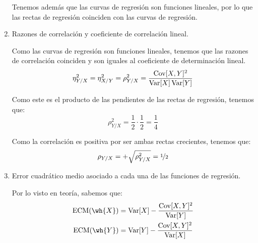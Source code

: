 \begin{ejercicio}
\begin{enumerate}
        Tenemos además que las curvas de regresión son funciones lineales, por lo que las rectas de regresión coinciden con las curvas de regresión.
        \item Razones de correlación y coeficiente de correlación lineal.
        
        Como las curvas de regresión son funciones lineales, tenemos que las razones de correlación coinciden y son iguales al coeficiente de determinación lineal.
        \begin{equation*}
            \eta_{Y/X}^2 = \eta_{X/Y}^2 = \rho_{Y/X}^2 = \dfrac{\operatorname{Cov}[X,Y]^2}{\operatorname{Var}[X]\operatorname{Var}[Y]}
        \end{equation*}
        
        Como este es el producto de las pendientes de las rectas de regresión, tenemos que:
        \begin{equation*}
            \rho_{Y/X}^2 = \dfrac{1}{2}\cdot \dfrac{1}{2} = \dfrac{1}{4}
        \end{equation*}

        Como la correlación es positiva por ser ambas rectas crecientes, tenemos que:
        \begin{equation*}
            \rho_{Y/X} =  + \sqrt{\rho_{Y/X}^2} = \nicefrac{1}{2}
        \end{equation*}

        \item Error cuadrático medio asociado a cada una de las funciones de regresión.
        
        Por lo visto en teoría, sabemos que:
        \begin{align*}
            \text{ECM}(\wh{X}) &= \Var[X] - \dfrac{\Cov[X,Y]^2}{\Var[Y]}\\
            \text{ECM}(\wh{Y}) &= \Var[Y] - \dfrac{\Cov[X,Y]^2}{\Var[X]}
        \end{align*}


\end{enumerate}
\end{ejercicio}
